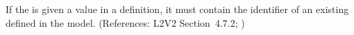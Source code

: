 If the   is given a
value in a \Compartment definition, it must contain the identifier
of an existing \CompartmentType defined in the model.
(References: L2V2 Section~4.7.2; )
